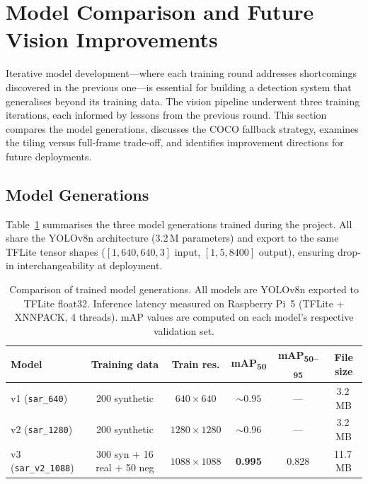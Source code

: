 \section{Model Comparison and Future Vision Improvements}\label{sec:model_comparison}

Iterative model development---where each training round addresses shortcomings discovered in the previous one---is essential for building a detection system that generalises beyond its training data.  The vision pipeline underwent three training iterations, each informed by lessons from the previous round.  This section compares the model generations, discusses the COCO fallback strategy, examines the tiling versus full-frame trade-off, and identifies improvement directions for future deployments.

\subsection{Model Generations}\label{sec:model_comparison:generations}

Table~\ref{tab:model_generations} summarises the three model generations trained during the project.  All share the YOLOv8n architecture (3.2\,M parameters) and export to the same TFLite tensor shapes ($[1,640,640,3]$ input, $[1,5,8400]$ output), ensuring drop-in interchangeability at deployment.

\begin{table}[ht]
    \centering
    \caption{Comparison of trained model generations.  All models are YOLOv8n exported to TFLite float32.  Inference latency measured on Raspberry Pi~5 (TFLite + XNNPACK, 4 threads).  mAP values are computed on each model's respective validation set.}
    \label{tab:model_generations}
    \begin{tabular}{@{}l c c c c c@{}}
        \toprule
        \textbf{Model} & \textbf{Training data} & \textbf{Train res.} & \textbf{mAP\textsubscript{50}} & \textbf{mAP\textsubscript{50--95}} & \textbf{File size} \\
        \midrule
        v1 (\texttt{sar\_640})     & 200 synthetic              & $640\times640$     & ${\sim}0.95$     & ---          & 3.2\,MB  \\
        v2 (\texttt{sar\_1280})    & 200 synthetic              & $1280\times1280$   & ${\sim}0.96$     & ---          & 3.2\,MB  \\
        v3 (\texttt{sar\_v2\_1088}) & 300 syn + 16 real + 50 neg & $1088\times1088$   & \textbf{0.995}   & 0.828        & 11.7\,MB \\
        \bottomrule
    \end{tabular}
\end{table}

